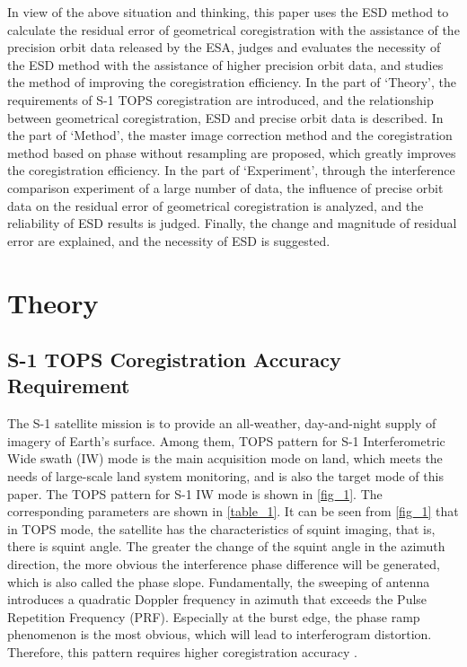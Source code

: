 \documentclass[a4paper,fleqn]{cas-sc}
\begin{document}
In view of the above situation and thinking, this paper uses the ESD method to calculate the residual error of geometrical coregistration with the assistance of the precision orbit data released by the ESA, judges and evaluates the necessity of the ESD method with the assistance of higher precision orbit data, and studies the method of improving the coregistration efficiency. In the part of ‘Theory’, the requirements of S-1 TOPS coregistration are introduced, and the relationship between geometrical coregistration, ESD and precise orbit data is described. In the part of ‘Method’, the master image correction method and the coregistration method based on phase without resampling are proposed, which greatly improves the coregistration efficiency. In the part of ‘Experiment’, through the interference comparison experiment of a large number of data, the influence of precise orbit data on the residual error of geometrical coregistration is analyzed, and the reliability of ESD results is judged. Finally, the change and magnitude of residual error are explained, and the necessity of ESD is suggested. \par


\section{Theory}\label{Theory}

\subsection{S-1 TOPS Coregistration Accuracy Requirement}
The S-1 satellite mission is to provide an all-weather, day-and-night supply of imagery of Earth’s surface. Among them, TOPS pattern for S-1 Interferometric Wide swath (IW) mode is the main acquisition mode on land, which meets the needs of large-scale land system monitoring, and is also the target mode of this paper. The TOPS pattern for S-1 IW mode is shown in \ref{fig_1}. The corresponding parameters are shown in \ref{table_1}. It can be seen from \ref{fig_1} that in TOPS mode, the satellite has the characteristics of squint imaging, that is, there is squint angle. The greater the change of the squint angle in the azimuth direction, the more obvious the interference phase difference will be generated, which is also called the phase slope. Fundamentally, the sweeping of antenna introduces a quadratic Doppler frequency in azimuth that exceeds the Pulse Repetition Frequency (PRF). Especially at the burst edge, the phase ramp phenomenon is the most obvious, which will lead to interferogram distortion. Therefore, this pattern requires higher coregistration accuracy \cite{Interferometry_with_TOPS:_coregistration_and_azimuth_shifts}. \par
\end{document}
